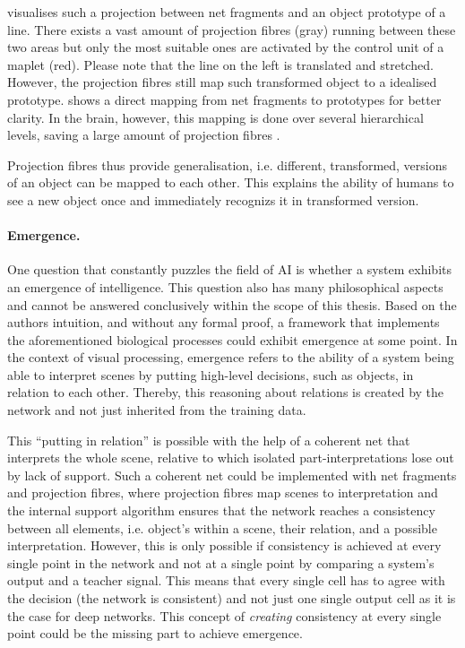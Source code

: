  visualises such a projection between net fragments and an object prototype of a line. There exists a vast amount of projection fibres (gray) running between these two areas but only the most suitable ones are activated by the control unit of a maplet (red).
Please note that the line on the left is translated and stretched. However, the projection fibres still map such transformed object to a idealised prototype.
 shows a direct mapping from net fragments to prototypes for better clarity. In the brain, however, this mapping is done over several hierarchical levels, saving a large amount of projection fibres .

Projection fibres thus provide generalisation, i.e. different, transformed, versions of an object can be mapped to each other. This explains the ability of humans to see a new object once and immediately recognizs it in transformed version.

\paragraph{Emergence.} One question that constantly puzzles the field of AI is whether a system exhibits an emergence of intelligence.
This question also has many philosophical aspects and cannot be answered conclusively within the scope of this thesis.
Based on the authors intuition, and without any formal proof, a framework that implements the aforementioned biological processes could exhibit emergence at some point.
In the context of visual processing, emergence refers to the ability of a system being able to interpret scenes by putting high-level decisions, such as objects, in relation to each other. Thereby, this reasoning about relations is created by the network and not just inherited from the training data.

This ``putting in relation'' is possible with the help of a coherent net that interprets the whole scene, relative to which isolated part-interpretations lose out by lack of support. Such a coherent net could be implemented with net fragments and projection fibres, where projection fibres map scenes to interpretation and the internal support algorithm ensures that the network reaches a consistency between all elements, i.e. object's within a scene, their relation, and a possible interpretation.
However, this is only possible if consistency is achieved at every single point in the network and not at a single point by comparing a system's output and a teacher signal.
This means that every single cell has to agree with the decision (the network is consistent) and not just one single output cell as it is the case for deep networks.
This concept of \emph{creating} consistency at every single point could be the missing part to achieve emergence.


